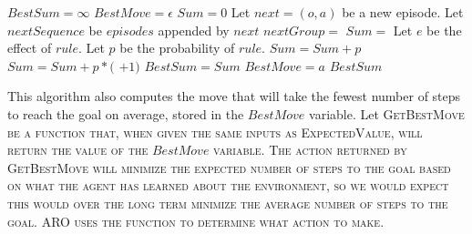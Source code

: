 \documentclass[letterpaper]{article} %
\begin{document}

\begin{algorithmic}[1]
		\State $BestSum = \infty$
		\State $BestMove = \epsilon$
			\State $Sum = 0$
			\State Let $next = (o, a)$ be a new episode.
			\State Let $nextSequence$ be $episodes$ appended by $next$
			\State $nextGroup =$  %
				\State $Sum = $  \label{line:heuristic}
			\EndIf
				\State Let $e$ be the effect of $rule$.
				\State Let $p$ be the probability of $rule$.
					\State $Sum = Sum + p$
				\Else
					\State $Sum = Sum + p*($ $ + 1)$
				\EndIf
			\EndFor
				\State $BestSum = Sum$
				\State $BestMove = a$
			\EndIf
		\EndFor
	\State \Return $BestSum$
	\EndFunction
\end{algorithmic}

This algorithm also computes the move that will take the fewest number of steps to reach the goal on average, stored in the $BestMove$ variable. Let \scshape GetBestMove \normalfont be a function that, when given the same inputs as \scshape ExpectedValue\normalfont, will return the value of the $BestMove$ variable. The action returned by \scshape GetBestMove \normalfont will minimize the expected number of steps to the goal based on what the agent has learned about the environment, so we would expect this would over the long term minimize the average number of steps to the goal. ARO uses the function to determine what action to make.
\end{document}
